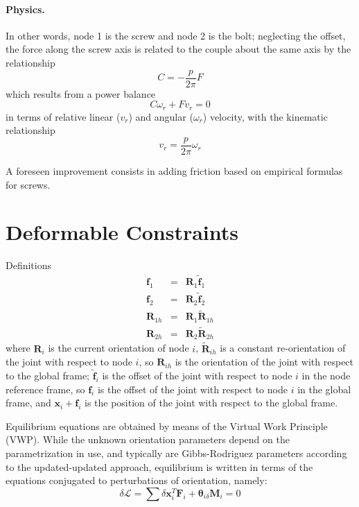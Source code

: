 \documentclass[10pt,dvips,fleqn]{report}
\newcommand{\T}[1]{\boldsymbol{#1}}
\begin{document}
\paragraph{Physics.}
In other words, node 1 is the screw and node 2 is the bolt;
neglecting the offset, the force along the screw axis is related
to the couple about the same axis by the relationship
\begin{equation}
	C = - \frac{p}{2\pi} F
\end{equation}
which results from a power balance
\begin{equation}
	C \omega_r + F v_r = 0
\end{equation}
in terms of relative linear ($v_r$) and angular ($\omega_r$) velocity,
with the kinematic relationship
\begin{equation} 
	v_r = \frac{p}{2\pi} \omega_r
\end{equation}

A foreseen improvement consists in adding friction based on empirical
formulas for screws.







\section{Deformable Constraints}
Definitions
\begin{eqnarray*}
	\T{f}_1 & = & \T{R}_1 \tilde{\T{f}}_1 \\
	\T{f}_2 & = & \T{R}_2 \tilde{\T{f}}_2 \\
	\T{R}_{1h} & = & \T{R}_1 \tilde{\T{R}}_{1h} \\
	\T{R}_{2h} & = & \T{R}_2 \tilde{\T{R}}_{2h}
\end{eqnarray*}
where $\T{R}_i$ is the current orientation of node $i$, 
$\tilde{\T{R}}_{ih}$ is a constant re-orientation of the joint
with respect to node $i$, so $\T{R}_{ih}$ is the orientation
of the joint with respect to the global frame;
$\tilde{\T{f}}_i$ is the offset of the joint with respect to
node $i$ in the node reference frame, so $\T{f}_i$ is the offset 
of the joint with respect to node $i$ in the global frame, and
$\T{x}_i+\T{f}_i$ is the position of the joint with respect 
to the global frame.

Equilibrium equations are obtained by means of the Virtual Work
Principle (VWP).
While the unknown orientation parameters depend on the parametrization 
in use, and typically are Gibbs-Rodriguez parameters according 
to the updated-updated approach, equilibrium is written in terms
of the equations conjugated to perturbations of orientation,
namely:
\begin{equation}
	\delta\mathcal{L} = \sum \delta\T{x}_i^T \T{F}_i
	+ \T{\theta}_{i\delta} \T{M}_i = 0
\end{equation}
\end{document}
